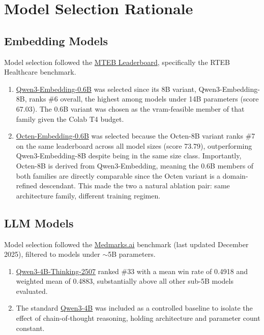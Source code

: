 \section{Model Selection Rationale}
\label{sec:model_selection}

\subsection{Embedding Models}


Model selection followed the \href{https://huggingface.co/spaces/mteb/leaderboard}{MTEB Leaderboard}, specifically the RTEB Healthcare benchmark. 

\begin{enumerate}
    \item \href{https://huggingface.co/Qwen/Qwen3-Embedding-0.6B}{Qwen3-Embedding-0.6B} was selected since its 8B variant, Qwen3-Embedding-8B, ranks \#6 overall, the highest among models under 14B parameters (score 67.03). The 0.6B variant was chosen as the \gls{vram}-feasible member of that family given the Colab T4 budget. 
    
    \item \href{https://huggingface.co/Onten/Octen-Embedding-0.6B}{Octen-Embedding-0.6B} was selected because the Octen-8B variant ranks \#7 on the same leaderboard across all model sizes (score 73.79), outperforming Qwen3-Embedding-8B despite being in the same size class. Importantly, Octen-8B is derived from Qwen3-Embedding, meaning the 0.6B members of both families are directly comparable since the Octen variant is a domain-refined descendant. This made the two a natural ablation pair: same architecture family, different training regimen. 
\end{enumerate}

\subsection{LLM Models}
Model selection followed the \href{https://medmarks.ai}{Medmarks.ai} benchmark (last updated December 2025), filtered to models under $\sim$5B parameters.

\begin{enumerate}
    \item \href{https://huggingface.co/Qwen/Qwen3-4B-Thinking-2507}{Qwen3-4B-Thinking-2507} ranked \#33 with a mean win rate of 0.4918 and weighted mean of 0.4883, substantially above all other sub-5B models evaluated.
    \item The standard \href{https://huggingface.co/Qwen/Qwen3-4B}{Qwen3-4B} was included as a controlled baseline to isolate the effect of chain-of-thought reasoning, holding architecture and parameter count constant.
\end{enumerate}